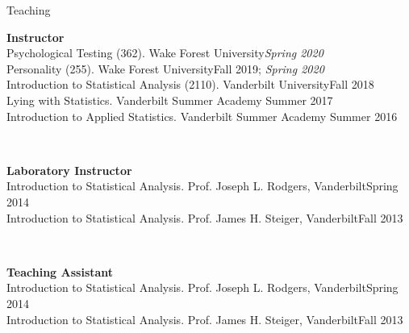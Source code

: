 \begin{rSection}{\textrm{Teaching}}
\vspace*{2pt}
\begin{minipage}{\linewidth}{\large {\bf Instructor}\\}
Psychological Testing  (362). Wake Forest University\hfill {\textit{Spring 2020}}\smallskip\\
Personality (255). Wake Forest University\hfill{Fall 2019; \textit{Spring 2020}}\smallskip\\
Introduction to Statistical Analysis (2110). Vanderbilt University\hfill {Fall 2018}\smallskip\\
Lying with Statistics. Vanderbilt Summer Academy \hfill{Summer 2017}%
\smallskip\\
Introduction to Applied Statistics. Vanderbilt Summer Academy \hfill{Summer 2016}%
\end{minipage}
\smallskip\\
\begin{minipage}{\linewidth}{\large {\bf Laboratory Instructor}\\}
Introduction to Statistical Analysis. Prof. Joseph L. Rodgers, Vanderbilt\hfill  {Spring 2014}%
\smallskip\\
Introduction to Statistical Analysis. Prof. James H. Steiger, Vanderbilt\hfill  {Fall 2013}%
\end{minipage}
\medskip\\
\begin{minipage}{\linewidth}{\large {\bf Teaching Assistant}}\\
Introduction to Statistical Analysis. Prof. Joseph L. Rodgers, Vanderbilt\hfill  {Spring 2014}\smallskip\\
Introduction to Statistical Analysis. Prof. James H. Steiger, Vanderbilt\hfill  {Fall 2013}\smallskip\\

\end{minipage}
\end{rSection}
